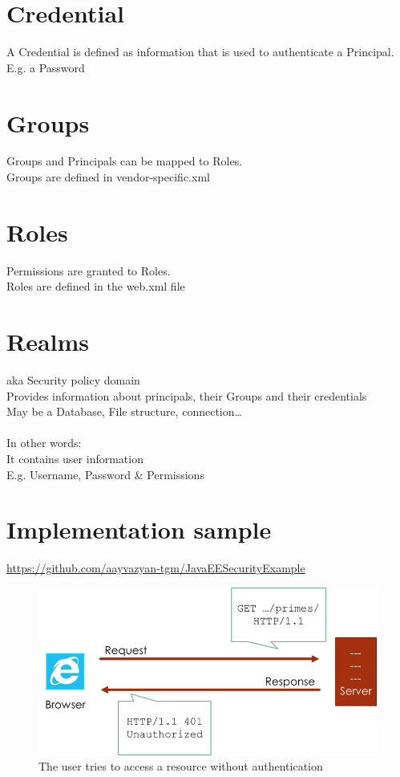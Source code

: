 \documentclass[12pt,a4paper]{report}
\begin{document}
\section{Credential}
A Credential is defined as information that is used to authenticate a Principal.\\
E.g. a Password\\

\section{Groups}
Groups and Principals can be mapped to Roles.\\
Groups are defined in vendor-specific.xml\\

\section{Roles}
Permissions are granted to Roles.\\
Roles are defined in the web.xml file\\

\section{Realms}
aka Security policy domain\\
Provides information about principals, their Groups and their credentials\\
May be a Database, File structure, connection…\\\\
In other words:\\
It contains user information\\
E.g. Username, Password \& Permissions\\

\newpage
\section{Implementation sample}
\href{https://github.com/aayvazyan-tgm/JavaEESecurityExample}{https://github.com/aayvazyan-tgm/JavaEESecurityExample}\\
\begin{figure}[h!]
\centering
\includegraphics[width=1\linewidth]{res/Unauthorized}
\caption{The user tries to access a resource without authentication}
\label{fig:Unauthorized}
\end{figure}
\end{document}

